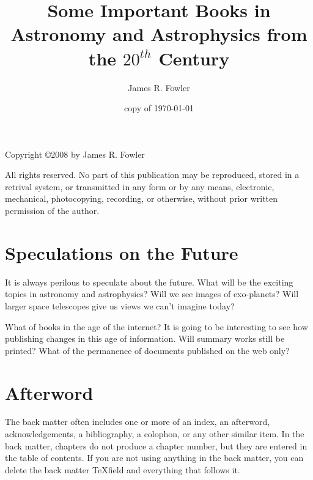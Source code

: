 \documentclass{book}%
\newcommand{\Cen}[1]{\ensuremath{#1^{th}} Century}
\begin{document}
\frontmatter
\title{Some Important Books in Astronomy and Astrophysics from the \Cen{20}}
\author{James R. Fowler}
\date{copy of \today}
\maketitle

\vspace*{5 in}
Copyright \copyright 2008 by James R. Fowler

All rights reserved. No part of this publication may be
reproduced, stored in a retrival system, or transmitted
in any form or by any means, electronic, mechanical,
photocopying, recording, or otherwise, without prior written
permission of the author.

\tableofcontents


\mainmatter









\chapter{Speculations on the Future}

It is always perilous to speculate about the future.
What will be the exciting topics in astronomy and astrophysics?
Will we see images of exo-planets?  Will larger space telescopes
give us views we can't imagine today?

What of books in the age of the internet?
It is going to be interesting to see how publishing
changes in this age of information.  Will
summary works still be printed? What of the permanence
of documents published on the web only? 

\appendix



\backmatter





\chapter{Afterword}

The back matter often includes one or more of an index, an afterword,
acknowledgements, a bibliography, a colophon, or any other similar item. In
the back matter, chapters do not produce a chapter number, but they are
entered in the table of contents. If you are not using anything in the back
matter, you can delete the back matter \TeX field and everything that follows it.

%
%
\end{document}

